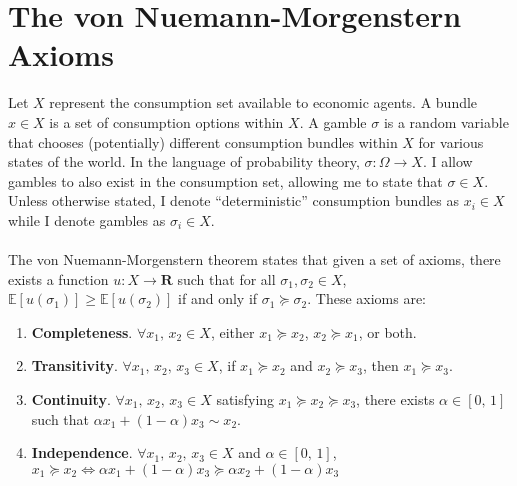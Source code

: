 \documentclass{article}
\begin{document}
\section{The von Nuemann-Morgenstern Axioms}

Let \(X\) represent the consumption set available to economic agents.  A bundle \(x \in X\) is a set of consumption options within \(X\).  A gamble \(\sigma\) is a random variable that chooses (potentially) different consumption bundles within \(X\) for various states of the world.  In the language of probability theory, \(\sigma: \Omega \to X\).  I allow gambles to also exist in the consumption set, allowing me to state that \(\sigma \in X\).  Unless otherwise stated, I denote ``deterministic'' consumption bundles as \(x_i \in X\) while I denote gambles as \(\sigma_i \in X\).     
\\
\\
The von Nuemann-Morgenstern theorem states that given a set of axioms, there exists a function \(u: X \to \mathbf{R}\) such that for all \(\sigma_1, \sigma_2 \in X\), \(\mathbb{E}\left[u(\sigma_1)\right] \geq \mathbb{E}\left[u(\sigma_2)\right]\) if and only if \(\sigma_1 \succeq  \sigma_2\).  These axioms are:

\begin{enumerate}
	\item \textbf{Completeness}.  \(\forall x_1, \, x_2 \in X\), either \(x_1 \succeq  x_2\), \(x_2 \succeq  x_1\), or both.
	\item \textbf{Transitivity}.  \(\forall x_1, \, x_2,\, x_3 \in X\), if \(x_1 \succeq  x_2\) and \(x_2 \succeq  x_3\), then \(x_1 \succeq  x_3\).
	\item \textbf{Continuity}.  \(\forall x_1, \, x_2,\,x_3 \in X\) satisfying \(x_1 \succeq  x_2 \succeq  x_3\), there exists \(\alpha \in [0,\,1]\) such that \(\alpha x_1+(1-\alpha) x_3 \sim x_2\).
	\item \textbf{Independence}.  \(\forall x_1, \, x_2,\,x_3 \in X\) and \(\alpha \in [0,\,1]\), \(x_1 \succeq  x_2 \Leftrightarrow \alpha x_1+(1-\alpha)x_3 \succeq  \alpha x_2 +(1-\alpha)x_3\)
\end{enumerate}
\end{document}
